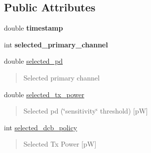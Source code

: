 \subsection*{Public Attributes}
\begin{DoxyCompactItemize}
\item 
\mbox{\label{structConfiguration_a9b2068dd7fbb1e0e5479a6195d949bc9}} 
double {\bfseries timestamp}
\item 
\mbox{\label{structConfiguration_a99cdf4a80e3f62cdd50d59651dac3369}} 
int {\bfseries selected\+\_\+primary\+\_\+channel}
\item 
\mbox{\label{structConfiguration_a87b3f53c024abf5840b961175c1a619b}} 
double \hyperlink{structConfiguration_a87b3f53c024abf5840b961175c1a619b}{selected\+\_\+pd}
\begin{DoxyCompactList}\small\item\em \begin{quote}
Selected primary channel \end{quote}
\end{DoxyCompactList}\item 
\mbox{\label{structConfiguration_a62528e39661726648fe211d3ad617b9d}} 
double \hyperlink{structConfiguration_a62528e39661726648fe211d3ad617b9d}{selected\+\_\+tx\+\_\+power}
\begin{DoxyCompactList}\small\item\em \begin{quote}
Selected pd (\char`\"{}sensitivity\char`\"{} threshold) \mbox{[}pW\mbox{]} \end{quote}
\end{DoxyCompactList}\item 
\mbox{\label{structConfiguration_ae44aafc37d6913050db940e5f4d2b74e}} 
int \hyperlink{structConfiguration_ae44aafc37d6913050db940e5f4d2b74e}{selected\+\_\+dcb\+\_\+policy}
\begin{DoxyCompactList}\small\item\em \begin{quote}
Selected Tx Power \mbox{[}pW\mbox{]} \end{quote}
\end{DoxyCompactList}\item 
\mbox{\label{structConfiguration_a662755287ac7f9ab73d7cde91a4b5b97}} 

\end{DoxyCompactItemize}
